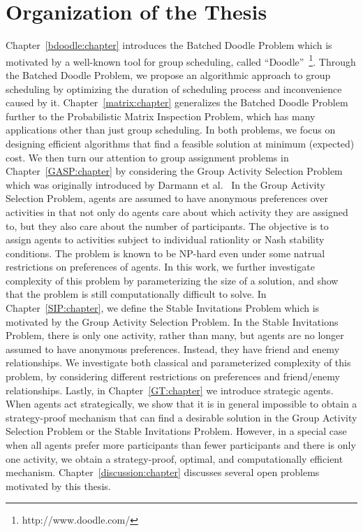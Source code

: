 \section{Organization of the Thesis}
Chapter~\ref{bdoodle:chapter} introduces the Batched Doodle Problem which is motivated by a well-known tool for group scheduling, called ``Doodle''~\footnote{http://www.doodle.com/}. Through the Batched Doodle Problem, we propose an algorithmic approach to group scheduling by optimizing the duration of scheduling process and inconvenience caused by it. Chapter~\ref{matrix:chapter} generalizes the Batched Doodle Problem further to the Probabilistic Matrix Inspection Problem, which has many applications other than just group scheduling. In both problems, we focus on designing efficient algorithms that find a feasible solution at minimum (expected) cost. 
We then turn our attention to group assignment problems in Chapter~\ref{GASP:chapter} by considering the Group Activity Selection Problem which was originally introduced by Darmann et al.~\cite{GASP12WINE} In the Group Activity Selection Problem, agents are assumed to have anonymous preferences over activities in that not only do agents care about which activity they are assigned to, but they also care about the number of participants. The objective is to assign agents to activities subject to individual rationlity or Nash stability conditions. The problem is known to be NP-hard even under some natrual restrictions on preferences of agents. In this work, we further investigate complexity of this problem by parameterizing the size of a solution, and show that the problem is still computationally difficult to solve. In Chapter~\ref{SIP:chapter}, we define the Stable Invitations Problem which is motivated by the Group Activity Selection Problem. In the Stable Invitations Problem, there is only one activity, rather than many, but agents are no longer assumed to have anonymous preferences. Instead, they have friend and enemy relationships. We investigate both classical and parameterized complexity of this problem, by considering different restrictions on preferences and friend/enemy relationships. Lastly, in Chapter~\ref{GT:chapter} we introduce strategic agents. When agents act strategically, we show that it is in general impossible to obtain a strategy-proof mechanism that can find a desirable solution in the Group Activity Selection Problem or the Stable Invitations Problem. However, in a special case when all agents prefer more participants than fewer participants and there is only one activity, we obtain a strategy-proof, optimal, and computationally efficient mechanism. 
Chapter~\ref{discussion:chapter} discusses several open problems motivated by this thesis. 
